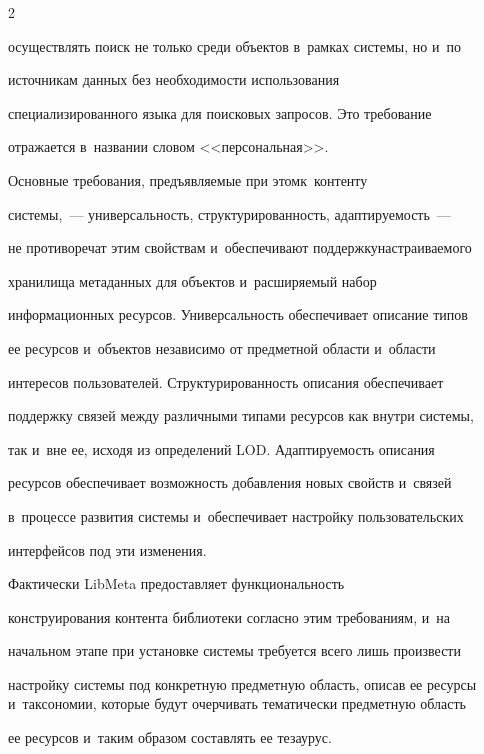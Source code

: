 \begin{multicols}{2}
\begin{enumerate}[(1)]
осуществлять поиск не только среди объектов в~рамках системы, но и~по 

источникам данных без необходимости использования 

специализированного языка для поисковых запросов. Это требование 

отражается в~названии словом <<персональная>>.

\end{enumerate}



     Основные требования, предъявляемые при этом\linebreak к~контенту  

сис\-те\-мы,~--- универсальность, структурированность, адаптируемость~--- 

не противо\-речат этим свойствам и~обеспечивают поддержку\linebreak настраива\-емого 

хранилища метаданных для объектов и~расширяемый набор 

информационных ресурсов. Универсальность обеспечивает описание типов 

ее ресурсов и~объектов независимо от предметной области и~области 

интересов пользователей. Структурированность описания обеспечивает 

поддержку связей между различными типами ресурсов как внутри системы, 

так и~вне ее, исходя из определений LOD. Адаптируемость описания 

ресурсов обеспечивает возможность добавления новых свойств и~связей 

в~процессе развития системы и~обеспечивает настройку пользовательских 

интерфейсов под эти изменения. 

     

     Фактически LibMeta предоставляет функциональность 

конструирования контента библиотеки согласно этим требованиям, и~на 

начальном этапе при установке системы требуется всего лишь произвести 

настройку системы под конкретную предметную область, описав ее ресурсы и~таксономии, которые будут очерчивать тематически предметную область 

ее ресурсов и~таким образом составлять ее тезаурус. 






\end{multicols}
